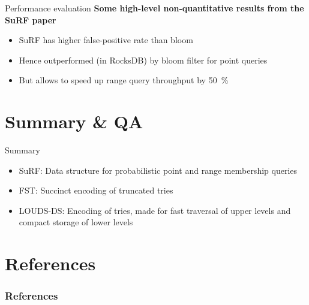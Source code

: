 \documentclass{beamer}
\begin{document}

\begin{frame}{Performance evaluation}
		\textbf{Some high-level non-quantitative results from the SuRF paper}
		\begin{itemize}
				\item SuRF has higher false-positive rate than bloom
				\item Hence outperformed (in RocksDB) by bloom filter for point queries
				\item But allows to speed up range query throughput by \qty{50}{\percent}
		\end{itemize}
\end{frame}

\section{Summary \& QA}

\begin{frame}{Summary}
		\begin{itemize}
				\item SuRF: Data structure for probabilistic point and range
						membership queries
				\item FST: Succinct encoding of truncated tries
				\item LOUDS-DS: Encoding of tries, made for fast traversal of
						upper levels and compact storage of lower levels
		\end{itemize}
\end{frame}

\section{References}

\begin{frame}[allowframebreaks]
		\frametitle{References}
		\printbibliography
\end{frame}
\end{document}
